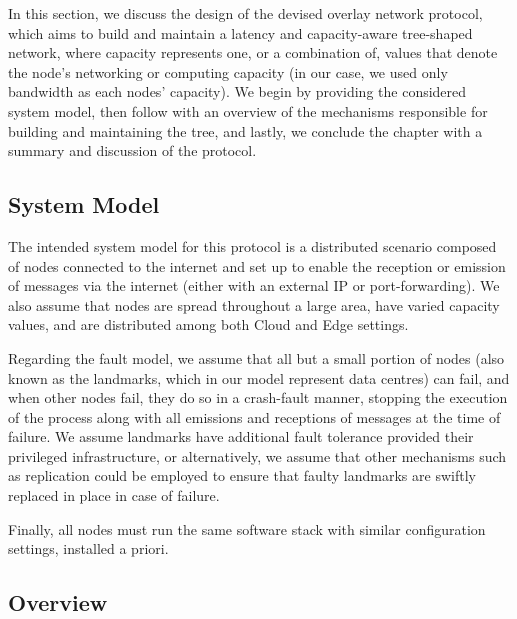 


In this section, we discuss the design of the devised overlay network protocol, which aims to build and maintain a latency and capacity-aware tree-shaped network, where capacity represents one, or a combination of, values that denote the node's networking or computing capacity (in our case, we used only bandwidth as each nodes' capacity). We begin by providing the considered system model, then follow with an overview of the mechanisms responsible for building and maintaining the tree, and lastly, we conclude the chapter with a summary and discussion of the protocol.

\subsection{System Model}

The intended system model for this protocol is a distributed scenario composed of nodes connected to the internet and set up to enable the reception or emission of messages via the internet (either with an external IP or port-forwarding). We also assume that nodes are spread throughout a large area, have varied capacity values, and are distributed among both Cloud and Edge settings.

Regarding the fault model, we assume that all but a small portion of nodes (also known as the landmarks, which in our model represent data centres) can fail, and when other nodes fail, they do so in a crash-fault manner, stopping the execution of the process along with all emissions and receptions of messages at the time of failure. We assume landmarks have additional fault tolerance provided their privileged infrastructure, or alternatively, we assume that other mechanisms such as replication could be employed to ensure that faulty landmarks are swiftly replaced in place in case of failure. 
  
Finally, all nodes must run the same software stack with similar configuration settings, installed a priori.

\subsection{Overview}

